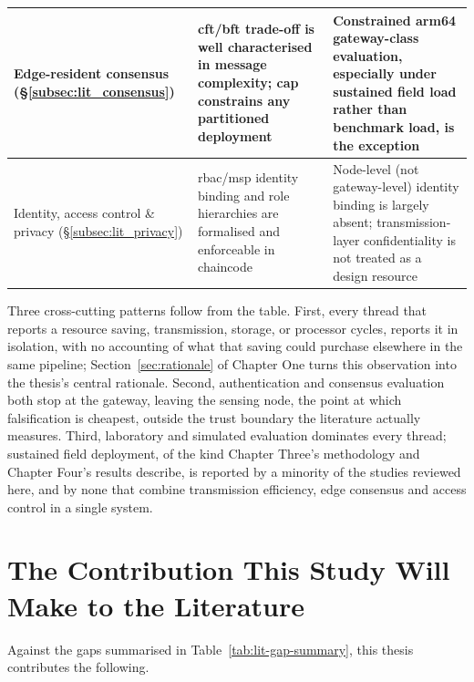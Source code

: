 \documentclass[12pt,a4paper,oneside]{book}
\begin{document}
\begin{table}[htbp]
\begin{tabularx}{\textwidth}{@{}p{}X X@{}}
\midrule
Edge-resident consensus (\S\ref{subsec:lit_consensus})
  & \gls{cft}/\gls{bft} trade-off is well characterised in message
    complexity; \gls{cap} constrains any partitioned deployment
  & Constrained \gls{arm64} gateway-class evaluation, especially under
    sustained field load rather than benchmark load, is the exception \\
\midrule
Identity, access control \& privacy (\S\ref{subsec:lit_privacy})
  & \gls{rbac}/\gls{msp} identity binding and role hierarchies are
    formalised and enforceable in chaincode
  & Node-level (not gateway-level) identity binding is largely absent;
    transmission-layer confidentiality is not treated as a design resource \\
\bottomrule
\end{tabularx}
\end{table}

Three cross-cutting patterns follow from the table. First, every thread
that reports a resource saving, transmission, storage, or processor
cycles, reports it in isolation, with no accounting of what that saving
could purchase elsewhere in the same pipeline; Section~\ref{sec:rationale}
of Chapter One turns this observation into the thesis's central rationale.
Second, authentication and consensus evaluation both stop at the gateway,
leaving the sensing node, the point at which falsification is cheapest,
outside the trust boundary the literature actually measures. Third,
laboratory and simulated evaluation dominates every thread; sustained
field deployment, of the kind Chapter Three's methodology and Chapter
Four's results describe, is reported by a minority of the studies
reviewed here, and by none that combine transmission efficiency, edge
consensus and access control in a single system.

\section{The Contribution This Study Will Make to the Literature}
\label{sec:lit_contribution}

Against the gaps summarised in Table~\ref{tab:lit-gap-summary}, this thesis
contributes the following.
\end{document}

